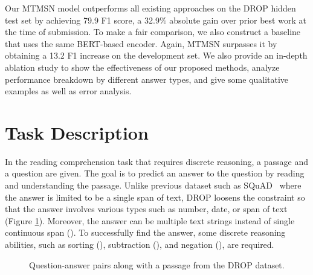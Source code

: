 \documentclass[11pt,a4paper]{article}
\begin{document}
Our MTMSN model outperforms all existing approaches on the DROP hidden test set by achieving 79.9 F1 score, a 32.9\% absolute gain over prior best work at the time of submission. 
To make a fair comparison, we also construct a baseline that uses the same BERT-based encoder.
Again, MTMSN surpasses it by obtaining a 13.2 F1 increase on the development set.
We also provide an in-depth ablation study to show the effectiveness of our proposed methods, analyze performance breakdown by different answer types, and give some qualitative examples as well as error analysis. \section{Task Description}
In the reading comprehension task that requires discrete reasoning, a passage and a question are given.
The goal is to predict an answer to the question by reading and understanding the passage.
Unlike previous dataset such as SQuAD~\cite{Rajpurkar16} where the answer is limited to be a single span of text, DROP loosens the constraint so that the answer involves various types such as number, date, or span of text (Figure \ref{fig:drop-example}). 
Moreover, the answer can be multiple text strings instead of single continuous span ().
To successfully find the answer, some discrete reasoning abilities, such as sorting (), subtraction (), and negation (), are required.

\begin{figure}[t]
\center
{}
\caption{Question-answer pairs along with a passage from the DROP dataset.}
\label{fig:drop-example}
\end{figure}
\end{document}
